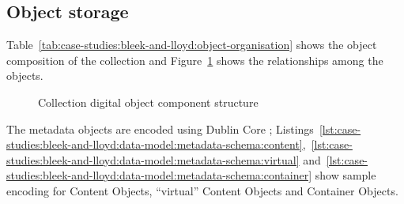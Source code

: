 
%


\tablespacing

\bodyspacing

\subsection{Object storage}
\label{sec:case-studies:bleek-and-lloyd:implementation}

\tablespacing

\bodyspacing

Table~\ref{tab:case-studies:bleek-and-lloyd:object-organisation} shows the object composition of the collection and Figure~\ref{fig:case-studies:bleek-and-lloyd:object-storage:object-relationships} shows the relationships among the objects.

\begin{figure}
 \centering
 \framebox[\textwidth]{
 
 }
 \caption{Collection digital object component structure}
 \label{fig:case-studies:bleek-and-lloyd:object-storage:object-relationships}
\end{figure}


The metadata objects are encoded using Dublin Core \citep{DCMI1999}; Listings~\ref{lst:case-studies:bleek-and-lloyd:data-model:metadata-schema:content},~\ref{lst:case-studies:bleek-and-lloyd:data-model:metadata-schema:virtual} and~\ref{lst:case-studies:bleek-and-lloyd:data-model:metadata-schema:container} show sample encoding for Content Objects, ``virtual'' Content Objects and Container Objects.

